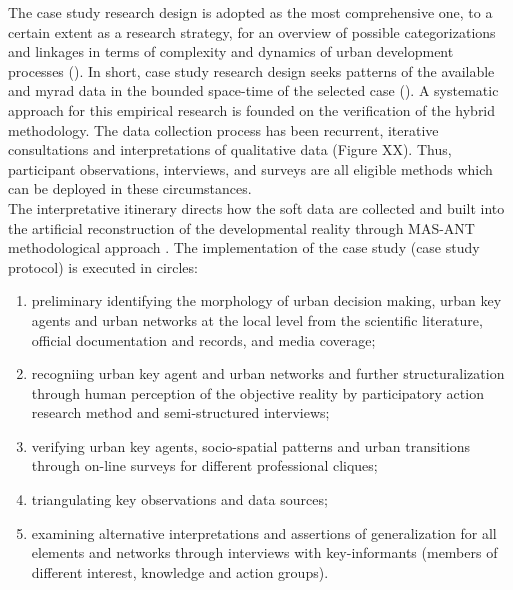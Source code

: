 \documentclass[11pt]{report}
\begin{document}
The case study research design is adopted as the most comprehensive one, to a certain extent as a research strategy, for an overview of possible categorizations and linkages in terms of complexity and dynamics of urban development processes (\cite{Meredith 1989, Harrison 2002}). In short, case study research design seeks patterns of the available and myrad data in the bounded space-time of the selected case (\cite{Denzin et al. XXXX}). A systematic approach for this empirical research is founded on the verification of the hybrid methodology. The data collection process has been recurrent, iterative consultations and interpretations of qualitative data (Figure XX). 
Thus, participant observations, interviews, and surveys are all eligible methods which can be deployed in these circumstances.
\\
The interpretative itinerary directs how the soft data are collected and built into the artificial reconstruction of the developmental reality through MAS-ANT methodological approach . The implementation of the case study (case study protocol) is executed in circles:
\begin{enumerate}
\item preliminary identifying the morphology of urban decision making, urban key agents and urban networks at the local level from the scientific literature, official documentation and records, and media coverage;
\item recogniing urban key agent and urban networks and further structuralization through human perception of the objective reality by participatory action research method and semi-structured interviews;
\item verifying urban key agents, socio-spatial patterns and urban transitions through on-line surveys for different professional cliques;
\item triangulating key observations and data sources;
\item examining alternative interpretations and assertions of generalization for all elements and networks through interviews with  key-informants (members of different interest, knowledge and action groups).
\end{enumerate}
\end{document}
